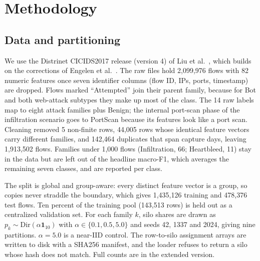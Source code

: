 \documentclass[conference]{IEEEtran}
\newif\iffullversion
\newcommand{\fullref}[1]{\iffullversion Appendix~\ref{#1}\else the extended version\fi}
\begin{document}
\section{Methodology}

\subsection{Data and partitioning}
We use the Distrinet CICIDS2017 release (version 4) of Liu et al.~\cite{liu2022}, %
which builds on the corrections of Engelen et al.~\cite{engelen2021}. The raw files hold
2,099,976 flows with 82 numeric features once seven identifier columns (flow ID, IPs, %
ports, timestamp) are dropped. Flows marked ``Attempted'' join their parent family,
because for Bot and both web-attack subtypes they make up most of the class. The 14 raw %
labels map to eight attack families plus Benign; the internal port-scan phase of the
infiltration scenario goes to PortScan because its features look like a port scan.
Cleaning removed 5 non-finite rows, 44,005 rows whose identical feature vectors carry %
different families, and 142,464 duplicates that span capture days, leaving 1,913,502 %
flows. Families under 1,000 flows (Infiltration, 66; Heartbleed, 11) stay in the data %
but are left out of the headline macro-F1, which averages the remaining seven classes,
and are reported per class.

The split is global and group-aware: every distinct feature vector is a group, so copies
never straddle the boundary, which gives 1,435,126 training and 478,376 test flows. Ten %
percent of the training pool (143,513 rows) is held out as a centralized validation set. %
For each family $k$, silo shares are drawn as $p_k\sim\mathrm{Dir}(\alpha\mathbf{1}_{10})$
with $\alpha\in\{0.1,0.5,5.0\}$ and seeds 42, 1337 and 2024, giving nine partitions. %
$\alpha=5.0$ is a near-IID control. The row-to-silo assignment arrays are written to disk %
with a SHA256 manifest, and the loader refuses to return a silo whose hash does not
match. Full counts are in \fullref{app:data}.
\end{document}
